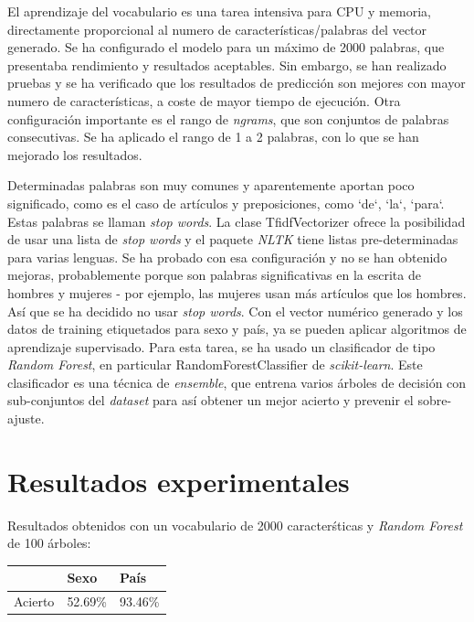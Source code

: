 \documentclass[11pt,a4paper]{article}
\begin{document}
  El aprendizaje del vocabulario es una tarea intensiva para CPU y memoria, directamente proporcional al numero de caracter\'isticas/palabras del vector generado. Se ha configurado el modelo para un m\'aximo de 2000 palabras, que presentaba rendimiento y resultados aceptables. Sin embargo, se han realizado pruebas y se ha verificado que los resultados de predicci\'on son mejores con mayor numero de caracter\'isticas, a coste de mayor tiempo de ejecuci\'on. Otra configuraci\'on importante es el rango de {\em ngrams}, que son conjuntos de palabras consecutivas. Se ha aplicado el rango de 1 a 2 palabras, con lo que se han mejorado los resultados.

  Determinadas palabras son muy comunes y aparentemente aportan poco significado, como es el caso de art\'iculos y preposiciones, como `de`, `la`, `para`. Estas palabras se llaman {\em stop words}. La clase {\ttfamily TfidfVectorizer} ofrece la posibilidad de usar una lista de {\em stop words} y el paquete {\em NLTK} tiene listas pre-determinadas para varias lenguas.  Se ha probado con esa configuraci\'on y no se han obtenido mejoras, probablemente porque son palabras significativas en la escrita de hombres y mujeres - por ejemplo, las mujeres usan m\'as art\'iculos que los hombres. As\'i que se ha decidido no usar {\em stop words}.
  Con el vector num\'erico generado y los datos de training etiquetados para sexo y pa\'is, ya se pueden aplicar algoritmos de aprendizaje supervisado. Para esta tarea, se ha usado un clasificador de tipo {\em Random Forest}, en particular {\ttfamily RandomForestClassifier} de {\em scikit-learn}. Este clasificador es una t\'ecnica de {\em ensemble}, que entrena varios \'arboles de decisi\'on con sub-conjuntos del {\em dataset} para as\'i obtener un mejor acierto y prevenir el sobre-ajuste.


\section{Resultados experimentales}

  Resultados obtenidos con un vocabulario de 2000 caracter\'sticas y {\em Random Forest} de 100 \'arboles:
    \begin{center}
	\begin{tabular}{ l | l | l }
	  & Sexo  & Pa\'is\\ \hline
	  Acierto & 52.69\% & 93.46\% \\
	  \hline 
	\end{tabular}
    \end{center}
    
\end{document}
